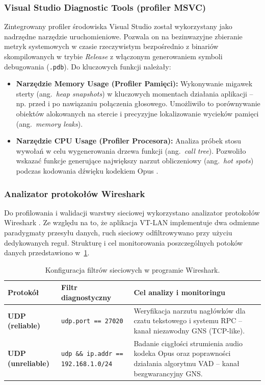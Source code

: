 \subsubsection{Visual Studio Diagnostic Tools (profiler MSVC)}
\label{subsubsec:db_msvc}

Zintegrowany profiler środowiska Visual Studio \cite{msvc_profiler} został
wykorzystany jako nadrzędne narzędzie uruchomieniowe. Pozwala on na bezinwazyjne
zbieranie metryk systemowych w czasie rzeczywistym bezpośrednio z binariów
skompilowanych w trybie \textit{Release} z włączonym generowaniem symboli
debugowania (\texttt{.pdb}). Do kluczowych funkcji należały:

\begin{itemize}
	\item \textbf{Narzędzie Memory Usage (Profiler Pamięci):} Wykonywanie
	migawek sterty (ang.~\textit{heap snapshots}) w kluczowych momentach
	działania aplikacji -- np. przed i po nawiązaniu połączenia głosowego.
	Umożliwiło to porównywanie obiektów alokowanych na stercie i precyzyjne
	lokalizowanie wycieków pamięci (ang.~\textit{memory leaks}).
	\item \textbf{Narzędzie CPU Usage (Profiler Procesora):} Analiza próbek
	stosu wywołań w celu wygenerowania drzewa funkcji (ang.~\textit{call tree}).
	Pozwoliło wskazać funkcje generujące największy narzut obliczeniowy
	(ang.~\textit{hot spots}) podczas kodowania dźwięku kodekiem Opus
	\cite{OpusRFC}.
\end{itemize}

\subsubsection{Analizator protokołów Wireshark}
\label{subsubsec:db_wireshark}

Do profilowania i walidacji warstwy sieciowej wykorzystano analizator protokołów
Wireshark \cite{wireshark_doc}. Ze względu na to, że aplikacja VT-LAN implementuje
dwa odmienne paradygmaty przesyłu danych, ruch sieciowy odfiltrowywano przy użyciu
dedykowanych reguł. Strukturę i cel monitorowania poszczególnych potoków danych
przedstawiono w~\cref{tab:db_filtry}.

\begin{table}[htbp]
	\centering
	\caption{Konfiguracja filtrów sieciowych w programie Wireshark.}
	\label{tab:db_filtry}
	\begin{tabular}{|l|p{4.2cm}|p{6.2cm}|}
		\hline
		\textbf{Protokół} & \textbf{Filtr diagnostyczny}         & \textbf{Cel analizy i monitoringu}                                         \\ \hline
		\textbf{UDP (reliable)} & \texttt{udp.port == 27020}      & Weryfikacja narzutu nagłówków dla czatu tekstowego i systemu RPC -- kanał niezawodny GNS (TCP-like). \\ \hline
		\textbf{UDP (unreliable)} & \texttt{udp \&\& ip.addr == 192.168.1.0/24} & Badanie ciągłości strumienia audio kodeka Opus \cite{OpusRFC} oraz poprawności działania algorytmu VAD -- kanał bezgwarancyjny GNS. \\ \hline
	\end{tabular}
\end{table}

